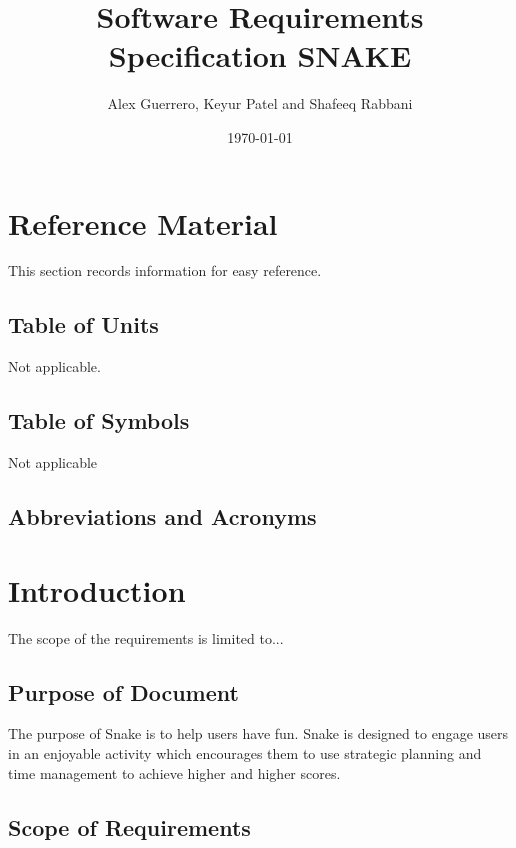 \documentclass[12pt]{article}
\begin{document}
\title{Software Requirements Specification
SNAKE
} 
\author{Alex Guerrero, Keyur Patel and Shafeeq Rabbani}
\date{\today}
	
\maketitle

\tableofcontents

\section{Reference Material}

This section records information for easy reference.

\subsection{Table of Units}

Not applicable.
~\newline
\renewcommand{\arraystretch}{1.2}
\subsection{Table of Symbols}
Not applicable
\subsection{Abbreviations and Acronyms}
\renewcommand{\arraystretch}{1.2}

\section{Introduction}

The scope of the requirements is limited to...

\subsection{Purpose of Document}

		The purpose of Snake is to help users have fun. Snake is designed to engage users in an enjoyable activity which encourages them to use strategic planning and time management to achieve higher and higher scores.
		
\subsection{Scope of Requirements} 
\end{document}
